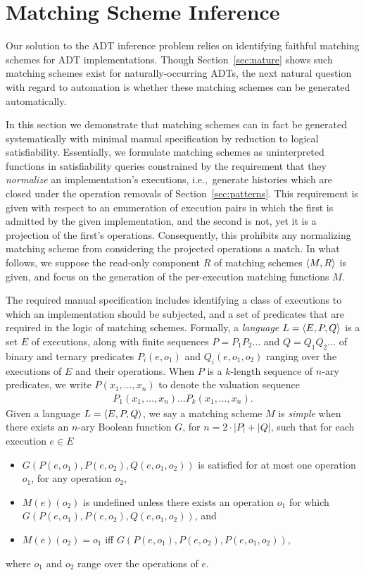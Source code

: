 \section{Matching Scheme Inference}
\label{sec:matching}

Our solution to the ADT inference problem relies on identifying faithful
matching schemes for ADT implementations. Though Section~\ref{sec:nature} shows
such matching schemes exist for naturally-occurring ADTs, the next natural
question with regard to automation is whether these matching schemes can be
generated automatically.

In this section we demonstrate that matching schemes can in fact be generated
systematically with minimal manual specification by reduction to logical
satisfiability. Essentially, we formulate matching schemes as uninterpreted
functions in satisfiability queries constrained by the requirement that they
\emph{normalize} an implementation’s executions, i.e.,~generate histories which
are closed under the operation removals of Section~\ref{sec:patterns}. This
requirement is given with respect to an enumeration of execution pairs in which
the first is admitted by the given implementation, and the second is not, yet
it is a projection of the first’s operations. Consequently, this prohibits any
normalizing matching scheme from considering the projected operations a match.
In what follows, we suppose the read-only component $R$ of matching schemes
${\left\langle{M,R}\right\rangle}$ is given, and focus on the generation of the per-execution matching
functions $M$.

The required manual specification includes identifying a class of executions to
which an implementation should be subjected, and a set of predicates that are
required in the logic of matching schemes. Formally, a \emph{language} $L =
{\left\langle{E,P,Q}\right\rangle}$ is a set $E$ of executions, along with finite sequences $P = P_1
P_2 \ldots$ and $Q = Q_1 Q_2 \ldots$ of binary and ternary predicates
$P_i(e,o_1)$ and $Q_i(e,o_1,o_2)$ ranging over the executions of $E$ and their
operations. When $P$ is a $k$-length sequence of $n$-ary predicates, we write
$P(x_1, \ldots, x_n)$ to denote the valuation sequence
\begin{align*}
  P_1(x_1, \ldots, x_n) \ldots P_k(x_1, \ldots, x_n).
\end{align*}
Given a language $L = {\left\langle{E,P,Q}\right\rangle}$, we say a matching scheme $M$ is
\emph{simple} when there exists an $n$-ary Boolean function $G$, for $n =
2\cdot|P|+|Q|$, such that for each execution $e \in E$
\begin{itemize}

  \item $G(P(e,o_1),P(e,o_2),Q(e,o_1,o_2))$ is satisfied for at most one
  operation $o_1$, for any operation $o_2$,

  \item $M(e)(o_2)$ is undefined unless there exists an operation $o_1$
  for which $G(P(e,o_1),P(e,o_2),Q(e,o_1,o_2))$, and

  \item $M(e)(o_2) = o_1$ if{f} $G(P(e,o_1),P(e,o_2),P(e,o_1,o_2))$,

\end{itemize}
where $o_1$ and $o_2$ range over the operations of $e$.

